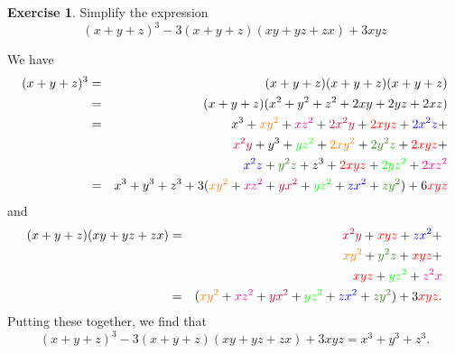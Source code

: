 \documentclass[a4paper]{book}
\newcommand{\RED}[1]{{\color{red}#1}}
\newcommand{\BLUE}[1]{{\color{blue}#1}}
\newcommand{\GREEN}[1]{{\color{green}#1}}
\newcommand{\PURPLE}[1]{{\color{purple}#1}}
\newcommand{\ORANGE}[1]{{\color{orange}#1}}
\newcommand{\MAGENTA}[1]{{\color{magenta}#1}}
\newcommand{\OLIVEGREEN}[1]{{\color{olivegreen}#1}}
\renewcommand{\:}{\colon}
\theoremstyle{definition}
\newtheorem{exercise}[theorem]{Exercise}
\renewenvironment{solution}{\SolutionInline}{\endSolutionInline}
\begin{document}
\begin{exercise}
 Simplify the expression
 \[ (x+y+z)^3 - 3(x+y+z)(xy+yz+zx) + 3xyz \]
\end{exercise}
\begin{solution}
 We have
 \begin{eqnarray*}
  (x+y+z)^3 &=& (x+y+z)(x+y+z)(x+y+z) \\
            &=& (x+y+z)(x^2+y^2+z^2+2xy+2yz+2xz) \\
            &=& x^3 + \ORANGE{xy^2} + \MAGENTA{xz^2} +
                \PURPLE{2x^2y} + \RED{2xyz} + \BLUE{2x^2z} + \\
            & & \PURPLE{x^2y} + y^3 + \GREEN{yz^2} +
                \ORANGE{2xy^2} + \OLIVEGREEN{2y^2z} + \RED{2xyz} + \\
            & & \BLUE{x^2z} + \OLIVEGREEN{y^2z} + z^3 +
                \RED{2xyz} + \GREEN{2yz^2} + \MAGENTA{2xz^2} \\
            &=& x^3 + y^3 + z^3 +
                3(\ORANGE{xy^2} + \MAGENTA{xz^2} +
                  \PURPLE{yx^2} + \GREEN{yz^2} +
                  \BLUE{zx^2} + \OLIVEGREEN{zy^2}) +
                6\RED{xyz}
 \end{eqnarray*}
 and
 \begin{eqnarray*}
  (x+y+z)(xy+yz+zx) &=& \PURPLE{x^2y} + \RED{xyz} + \BLUE{zx^2} + \\
                    & & \ORANGE{xy^2} + \OLIVEGREEN{y^2z} + \RED{xyz} + \\
                    & & \RED{xyz} + \GREEN{yz^2} + \MAGENTA{z^2x} \\
                    &=& (\ORANGE{xy^2} + \MAGENTA{xz^2} +
                         \PURPLE{yx^2} + \GREEN{yz^2} +
                         \BLUE{zx^2} + \OLIVEGREEN{zy^2}) +
                        3\RED{xyz}.
 \end{eqnarray*}
 Putting these together, we find that
 \[ (x+y+z)^3 - 3(x+y+z)(xy+yz+zx) + 3xyz = x^3 + y^3 + z^3. \]
\end{solution}
\end{document}
